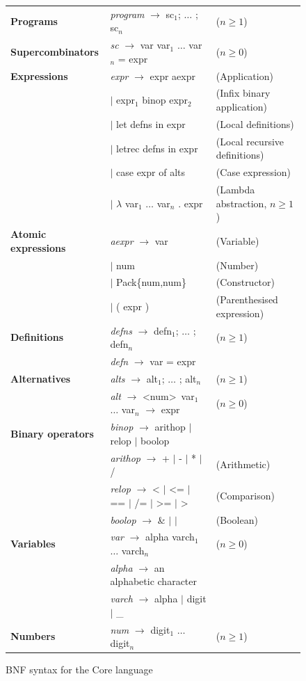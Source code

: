 \documentclass[11pt]{article}
\begin{document}
\begin{figure}
\centering
\begin{tabularx}{\textwidth}{llX}
\textbf{Programs} & \textit{program} $\rightarrow$ sc$_1$; $\ldots$ ; sc$_n$ & ($n \geq 1$) \\
\textbf{Supercombinators} & \textit{sc} $\rightarrow$ var var$_1$ $\ldots$ var$_n$ = expr & ($n \geq 0$) \\
\textbf{Expressions} & \textit{expr} $\rightarrow$ expr aexpr & (Application) \\
& $|$ expr$_1$ binop expr$_2$ & (Infix binary application) \\
& $|$ let defns in expr & (Local definitions) \\
& $|$ letrec defns in expr & (Local recursive definitions) \\
& $|$ case expr of alts & (Case expression) \\
& $|$ $\lambda$ var$_1$ $\ldots$ var$_n$ . expr & (Lambda abstraction, $n \geq 1$) \\
\textbf{Atomic expressions} & \textit{aexpr} $\rightarrow$ var & (Variable) \\
& $|$ num & (Number) \\
& $|$ Pack\{num,num\} & (Constructor) \\
& $|$ ( expr ) & (Parenthesised expression) \\
\textbf{Definitions} & \textit{defns} $\rightarrow$ defn$_1$; $\ldots$ ; defn$_n$ & ($n \geq 1$) \\
& \textit{defn} $\rightarrow$ var = expr \\
\textbf{Alternatives} & \textit{alts} $\rightarrow$ alt$_1$; $\ldots$ ; alt$_n$ & ($n \geq 1$) \\
& \textit{alt} $\rightarrow$ \textless num\textgreater\ var$_1$ $\ldots$ var$_n$ $\rightarrow$ expr & ($n \geq 0$) \\
\textbf{Binary operators} & \textit{binop} $\rightarrow$ arithop $|$ relop $|$ boolop \\
& \textit{arithop} $\rightarrow$ + $|$ - $|$ * $|$ / & (Arithmetic) \\
& \textit{relop} $\rightarrow$ < $|$ <= $|$ == $|$ /= $|$ >= $|$ > & (Comparison) \\
& \textit{boolop} $\rightarrow$ \& $|$ $|$ & (Boolean) \\
\textbf{Variables} & \textit{var} $\rightarrow$ alpha varch$_1$ $\ldots$ varch$_n$ & ($n \geq 0$) \\
& \textit{alpha} $\rightarrow$ an alphabetic character \\
& \textit{varch} $\rightarrow$ alpha $|$ digit $|$ \_ \\
\textbf{Numbers} & \textit{num} $\rightarrow$ digit$_1$ $\ldots$ digit$_n$ & ($n \geq 1$)
\end{tabularx}
\caption{BNF syntax for the Core language}
\label{fig:bnf}
\end{figure}
\end{document}
